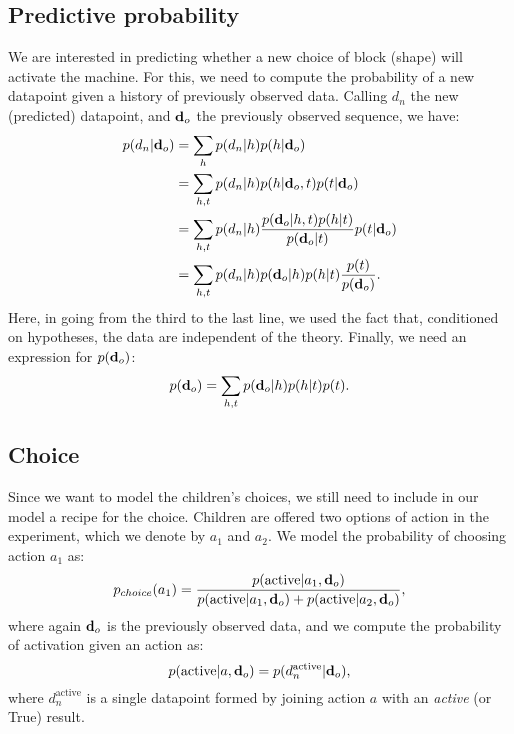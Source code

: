 \documentclass[11pt, a4paper]{article}
\begin{document}
\subsection*{Predictive probability}
We are interested in predicting whether a new choice of block (shape) will activate the machine. For this, we need to compute the probability of a new datapoint given a history of previously observed data. Calling $d_n$ the new (predicted) datapoint, and $\textbf d_o$ the previously observed sequence, we have:
\begin{equation}
\begin{split}
p(d_n|\textbf d_o)&=\sum_h p(d_n|h)p(h|\textbf d_o)\\
&=\sum_{h,t} p(d_n|h) p(h|\textbf d_o, t) p(t|\textbf d_o)\\
&=\sum_{h,t} p(d_n|h) \frac{p(\textbf d_o| h, t) p(h|t)}{p(\textbf d_o|t)} p(t|\textbf d_o)\\
&=\sum_{h,t} p(d_n|h) p(\textbf d_o| h) p(h|t)\frac{p(t)}{p(\textbf d_o)}.
\end{split}
\end{equation}
Here, in going from the third to the last line, we used the fact that, conditioned on hypotheses, the data are independent of the theory. Finally, we need an expression for $p(\textbf d_o)$:
\begin{equation}
p(\textbf d_o)=\sum_{h,t} p(\textbf d_o|h) p(h|t) p(t).
\end{equation}

\subsection*{Choice}
Since we want to model the children's choices, we still need to include in our model a recipe for the choice. Children are offered two options of action in the experiment, which we denote by $a_1$ and $a_2$. We model the probability of choosing action $a_1$ as:
\begin{equation}
p_{choice}(a_1)=\frac{p(\textrm{active}|a_1,\textbf d_o)}{p(\textrm{active}|a_1,\textbf d_o)+p(\textrm{active}|a_2,\textbf d_o)},
\end{equation} 
where again $\textbf d_o$ is the previously observed data, and we compute the probability of activation given an action as:
\begin{equation}
p(\textrm{active}|a,\textbf d_o)= p(d^{\textrm{active}}_n|\textbf d_o),
\end{equation}
where $d^{\textrm{active}}_n$ is a single datapoint formed by joining action $a$ with an \emph{active} (or True) result.
\end{document}
